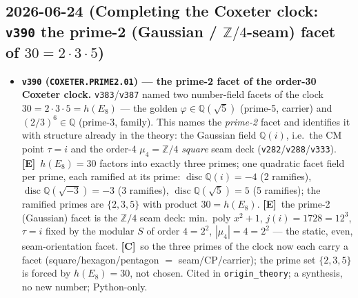 \documentclass[11pt]{article}
\providecommand{\mE}{\textbf{[E]}}\providecommand{\mC}{\textbf{[C]}}
\providecommand{\vref}[1]{\texttt{#1}}
\begin{document}
\subsection*{2026-06-24 (Completing the Coxeter clock: \texttt{v390} the prime-2 (Gaussian / $\mathbb Z/4$-seam) facet of $30=2{\cdot}3{\cdot}5$)}
\begin{itemize}
\item \textbf{\texttt{v390} (\texttt{COXETER.PRIME2.01}) --- the prime-2 facet of the order-30 Coxeter clock.}
\vref{v383}/\vref{v387} named two number-field facets of the clock $30=2{\cdot}3{\cdot}5=h(E_8)$ --- the golden
$\varphi\in\mathbb Q(\sqrt5)$ (prime-5, carrier) and $(2/3)^6\in\mathbb Q$ (prime-3, family). This names the
\emph{prime-2} facet and identifies it with structure already in the theory: the Gaussian field $\mathbb Q(i)$, i.e.\
the CM point $\tau=i$ and the order-4 $\mu_4=\mathbb Z/4$ \emph{square} seam deck (\vref{v282}/\vref{v288}/\vref{v333}).
\mE\ $h(E_8)=30$ factors into exactly three primes; one quadratic facet field per prime, each ramified at its prime:
$\operatorname{disc}\mathbb Q(i)=-4$ (2 ramifies), $\operatorname{disc}\mathbb Q(\sqrt{-3})=-3$ (3 ramifies),
$\operatorname{disc}\mathbb Q(\sqrt5)=5$ (5 ramifies); the ramified primes are $\{2,3,5\}$ with product $30=h(E_8)$.
\mE\ the prime-2 (Gaussian) facet is the $\mathbb Z/4$ seam deck: min.\ poly $x^2+1$, $j(i)=1728=12^3$, $\tau=i$ fixed by
the modular $S$ of order $4=2^2$, $|\mu_4|=4=2^2$ --- the static, even, seam-orientation facet. \mC\ so the three primes
of the clock now each carry a facet (square/hexagon/pentagon $=$ seam/CP/carrier); the prime set $\{2,3,5\}$ is forced by
$h(E_8)=30$, not chosen. Cited in \texttt{origin\_theory}; a synthesis, no new number; Python-only.
\end{itemize}
\end{document}
